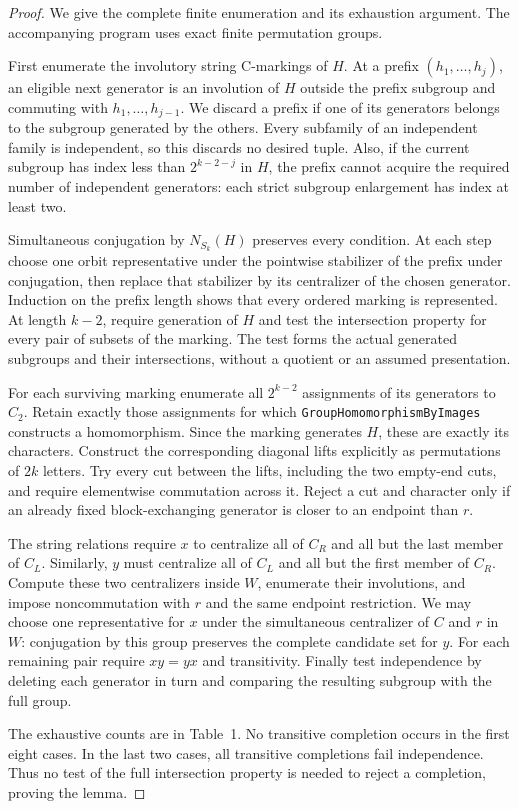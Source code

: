 \documentclass[11pt]{article}
\begin{document}
\begin{proof}
We give the complete finite enumeration and its exhaustion argument.
The accompanying program uses exact finite permutation groups.

First enumerate the involutory string C-markings of $H$. At a prefix
$(h_1,\ldots,h_j)$, an eligible next generator is an involution of $H$
outside the prefix subgroup and commuting with $h_1,\ldots,h_{j-1}$.
We discard a prefix if one of its generators belongs to the subgroup
generated by the others. Every subfamily of an independent family
is independent, so this discards no desired tuple. Also, if the
current subgroup has index less than $2^{k-2-j}$ in $H$, the prefix
cannot acquire the required number of independent generators: each
strict subgroup enlargement has index at least two.

Simultaneous conjugation by $N_{S_k}(H)$ preserves every condition.
At each step choose one orbit representative under the pointwise
stabilizer of the prefix under conjugation, then replace that
stabilizer by its centralizer of the chosen generator. Induction on
the prefix length shows that every ordered marking is represented.
At length $k-2$, require generation of $H$ and test the intersection
property for every pair of subsets of the marking. The test forms
the actual generated subgroups and their intersections, without a
quotient or an assumed presentation.

For each surviving marking enumerate all $2^{k-2}$ assignments of
its generators to $C_2$. Retain exactly those assignments for which
\texttt{GroupHomomorphismByImages} constructs a homomorphism.
Since the marking generates $H$, these are exactly its characters.
Construct the corresponding diagonal lifts explicitly as
permutations of $2k$ letters. Try every cut between the lifts,
including the two empty-end cuts, and require elementwise
commutation across it. Reject a cut and character only if an
already fixed block-exchanging generator is closer to an endpoint
than $r$.

The string relations require $x$ to centralize all of $C_R$ and
all but the last member of $C_L$. Similarly, $y$ must centralize
all of $C_L$ and all but the first member of $C_R$. Compute these
two centralizers inside $W$, enumerate their involutions, and impose
noncommutation with $r$ and the same endpoint restriction. We may
choose one representative for $x$ under the simultaneous centralizer
of $C$ and $r$ in $W$: conjugation by this group preserves the complete
candidate set for $y$. For each remaining pair require $xy=yx$ and
transitivity. Finally test independence by deleting each generator
in turn and comparing the resulting subgroup with the full group.

The exhaustive counts are in Table~1. No transitive completion occurs
in the first eight cases. In the last two cases, all transitive
completions fail independence. Thus no test of the full intersection
property is needed to reject a completion, proving the lemma.
\end{proof}
\end{document}
